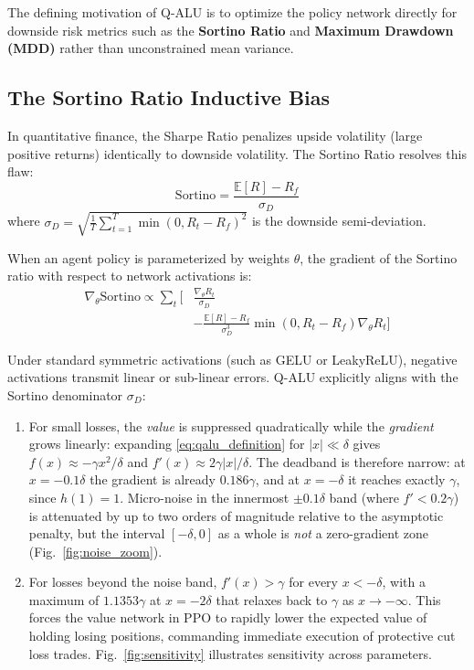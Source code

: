 \documentclass[conference]{IEEEtran}
\begin{document}
The defining motivation of Q-ALU is to optimize the policy network directly for downside risk metrics such as the \textbf{Sortino Ratio} and \textbf{Maximum Drawdown (MDD)} rather than unconstrained mean variance.

\subsection{The Sortino Ratio Inductive Bias}
In quantitative finance, the Sharpe Ratio penalizes upside volatility (large positive returns) identically to downside volatility. The Sortino Ratio resolves this flaw:
\begin{equation}
\text{Sortino} = \frac{\mathbb{E}[R] - R_f}{\sigma_D}
\end{equation}
where $\sigma_D = \sqrt{\frac{1}{T} \sum_{t=1}^T \min(0, R_t - R_f)^2}$ is the downside semi-deviation.

When an agent policy is parameterized by weights $\theta$, the gradient of the Sortino ratio with respect to network activations is:
\begin{equation}
\begin{split}
\nabla_{\theta}\text{Sortino} \propto \sum_{t}\bigg[ &\frac{\nabla_{\theta}R_t}{\sigma_D} \\
&- \frac{\mathbb{E}[R]-R_f}{\sigma_D^3}\min(0, R_t - R_f)\nabla_{\theta}R_t\bigg]
\end{split}
\end{equation}

Under standard symmetric activations (such as GELU or LeakyReLU), negative activations transmit linear or sub-linear errors. Q-ALU explicitly aligns with the Sortino denominator $\sigma_D$:
\begin{enumerate}
    \item For small losses, the \emph{value} is suppressed quadratically while the \emph{gradient} grows linearly: expanding \eqref{eq:qalu_definition} for $|x| \ll \delta$ gives $f(x) \approx -\gamma x^2/\delta$ and $f'(x) \approx 2\gamma |x|/\delta$. The deadband is therefore narrow: at $x = -0.1\delta$ the gradient is already $0.186\gamma$, and at $x = -\delta$ it reaches exactly $\gamma$, since $h(1) = 1$. Micro-noise in the innermost $\pm 0.1\delta$ band (where $f' < 0.2\gamma$) is attenuated by up to two orders of magnitude relative to the asymptotic penalty, but the interval $[-\delta, 0]$ as a whole is \emph{not} a zero-gradient zone (Fig.~\ref{fig:noise_zoom}).
    \item For losses beyond the noise band, $f'(x) > \gamma$ for every $x < -\delta$, with a maximum of $1.1353\gamma$ at $x = -2\delta$ that relaxes back to $\gamma$ as $x \to -\infty$. This forces the value network in PPO to rapidly lower the expected value of holding losing positions, commanding immediate execution of protective cut loss trades. Fig.~\ref{fig:sensitivity} illustrates sensitivity across parameters.
\end{enumerate}
\end{document}
